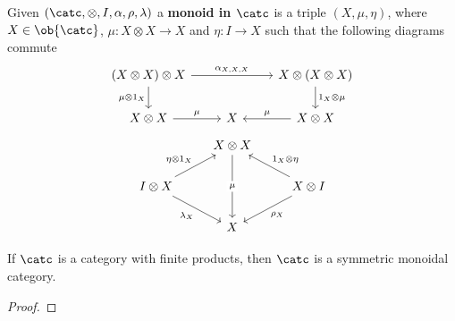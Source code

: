 \begin{definition}
    Given $(\catc, \otimes,I, \alpha, \rho, \lambda)$ a \textbf{monoid in $\catc$} 
    is a triple $(X,\mu,\eta)$, where $X\in\ob{\catc}$, $\mu : X \otimes X \to X$ and 
    $\eta: I \to X$ such that the following diagrams commute
    \[\begin{tikzcd}
	{(X\otimes X)\otimes X} && {X\otimes(X\otimes X) } \\
	{X\otimes X} & X & {X\otimes X}
	\arrow["{\alpha_{X,X,X}}", from=1-1, to=1-3]
	\arrow["{\mu\otimes 1_X}"', from=1-1, to=2-1]
	\arrow["{1_X\otimes \mu}", from=1-3, to=2-3]
	\arrow["\mu", from=2-1, to=2-2]
	\arrow["\mu"', from=2-3, to=2-2]
    \end{tikzcd}\]
    \[\begin{tikzcd}
	& {X\otimes X} \\
	{I\otimes X} && {X\otimes I} \\
	& X
	\arrow["\mu"{description}, from=1-2, to=3-2]
	\arrow["{\eta\otimes 1_X}", from=2-1, to=1-2]
	\arrow["{\lambda_X}"', from=2-1, to=3-2]
	\arrow["{1_X\otimes\eta}"', from=2-3, to=1-2]
	\arrow["{\rho_X}", from=2-3, to=3-2]
\end{tikzcd}\]
\end{definition}
\begin{proposition}
    If $\catc$ is a category with finite products, then $\catc$
    is a symmetric monoidal category.
\end{proposition}
\begin{proof}[Proof]
    
\end{proof}